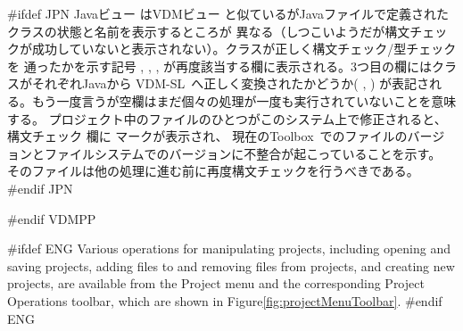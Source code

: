 \documentclass[\pformat,12pt]{article}
\newcommand{\vdmslpp}{VDM-SL}
\newcommand{\Toolbox}{Toolbox}
\newcommand{\vdmslpp}{VDM++}
\newcommand{\Toolbox}{Toolbox}
\newcommand{\guicmd}[1]{{\sf #1}}
\newcommand{\guicmd}[1]{{\gt #1}}
\begin{document}
#ifdef JPN
\guicmd{Javaビュー} は\guicmd{VDMビュー} と似ているがJavaファイルで定義されたクラスの状態と名前を表示するところが
異なる（しつこいようだが構文チェックが成功していないと表示されない）。クラスが正しく構文チェック/型チェックを
通ったかを示す記号
,
,
,
が再度該当する欄に表示される。3つ目の欄にはクラスがそれぞれJavaから \vdmslpp\ へ正しく変換されたかどうか(
,
)
が表記される。もう一度言うが空欄はまだ個々の処理が一度も実行されていないことを意味する。
プロジェクト中のファイルのひとつがこのシステム上で修正されると、\guicmd{構文チェック} 欄に 
マークが表示され、
現在の\Toolbox\ でのファイルのバージョンとファイルシステムでのバージョンに不整合が起こっていることを示す。
そのファイルは他の処理に進む前に再度構文チェックを行うべきである。
#endif JPN

#endif VDMPP

#ifdef ENG
Various operations for manipulating projects, including opening and
saving projects, adding files to and removing files from projects, and
creating new projects, are available from the \guicmd{Project}
menu and the corresponding \guicmd{Project
  Operations} toolbar, which are
shown in Figure\ref{fig:projectMenuToolbar}.
#endif ENG
\end{document}
